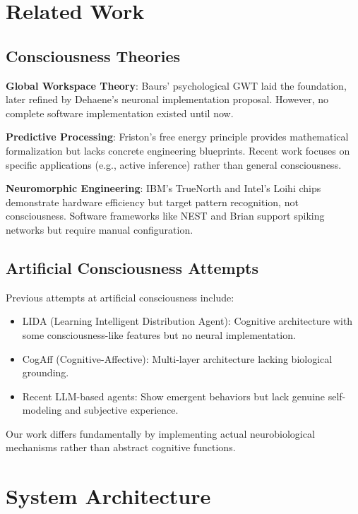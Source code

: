 \documentclass[twocolumn,10pt]{article}
\begin{document}
\section{Related Work}

\subsection{Consciousness Theories}

\textbf{Global Workspace Theory}: Baurs' psychological GWT laid the foundation, later refined by Dehaene's neuronal implementation proposal. However, no complete software implementation existed until now.

\textbf{Predictive Processing}: Friston's free energy principle provides mathematical formalization but lacks concrete engineering blueprints. Recent work focuses on specific applications (e.g., active inference) rather than general consciousness.

\textbf{Neuromorphic Engineering}: IBM's TrueNorth and Intel's Loihi chips demonstrate hardware efficiency but target pattern recognition, not consciousness. Software frameworks like NEST and Brian support spiking networks but require manual configuration.

\subsection{Artificial Consciousness Attempts}

Previous attempts at artificial consciousness include:
\begin{itemize}
    \item LIDA (Learning Intelligent Distribution Agent): Cognitive architecture with some consciousness-like features but no neural implementation.
    \item CogAff (Cognitive-Affective): Multi-layer architecture lacking biological grounding.
    \item Recent LLM-based agents: Show emergent behaviors but lack genuine self-modeling and subjective experience.
\end{itemize}

Our work differs fundamentally by implementing actual neurobiological mechanisms rather than abstract cognitive functions.

\section{System Architecture}
\end{document}
